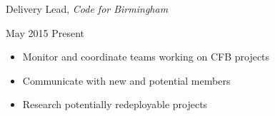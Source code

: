 \documentclass[11pt]{article}
\begin{document}
\vspace{0.4em}
\begin{minipage}[t]{0.7\textwidth}
\flushleft
Delivery Lead, \textit{Code for Birmingham}\\
\end{minipage}
\begin{minipage}[t]{0.3\textwidth}
\flushright
May 2015 \space \textemdash \space Present\\
\end{minipage}

\begin{itemize}
  \item Monitor and coordinate teams working on CFB projects
  \item Communicate with new and potential members
  \item Research potentially redeployable projects
\end{itemize}
\end{document}
